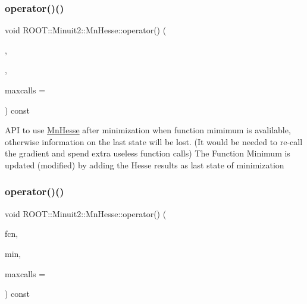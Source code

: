 \subsubsection{\texorpdfstring{operator()()}{operator()()}\hspace{0.1cm}{\footnotesize\ttfamily [13/16]}}
{\footnotesize\ttfamily void R\+O\+O\+T\+::\+Minuit2\+::\+Mn\+Hesse\+::operator() (\begin{DoxyParamCaption}\item[{const \mbox{\hyperlink{classROOT_1_1Minuit2_1_1FCNBase}{F\+C\+N\+Base}} \&}]{,  }\item[{\mbox{\hyperlink{classROOT_1_1Minuit2_1_1FunctionMinimum}{Function\+Minimum}} \&}]{,  }\item[{unsigned int}]{maxcalls = {} }\end{DoxyParamCaption}) const}

A\+PI to use \mbox{\hyperlink{classROOT_1_1Minuit2_1_1MnHesse}{Mn\+Hesse}} after minimization when function mimimum is avalilable, otherwise information on the last state will be lost. (It would be needed to re-\/call the gradient and spend extra useless function calls) The Function Minimum is updated (modified) by adding the Hesse results as last state of minimization \mbox{\label{classROOT_1_1Minuit2_1_1MnHesse_a3b6ba68a41260029bc6bde433170e600}} 
\subsubsection{\texorpdfstring{operator()()}{operator()()}\hspace{0.1cm}{\footnotesize\ttfamily [14/16]}}
{\footnotesize\ttfamily void R\+O\+O\+T\+::\+Minuit2\+::\+Mn\+Hesse\+::operator() (\begin{DoxyParamCaption}\item[{const \mbox{\hyperlink{classROOT_1_1Minuit2_1_1FCNBase}{F\+C\+N\+Base}} \&}]{fcn,  }\item[{\mbox{\hyperlink{classROOT_1_1Minuit2_1_1FunctionMinimum}{Function\+Minimum}} \&}]{min,  }\item[{unsigned int}]{maxcalls = {} }\end{DoxyParamCaption}) const}

